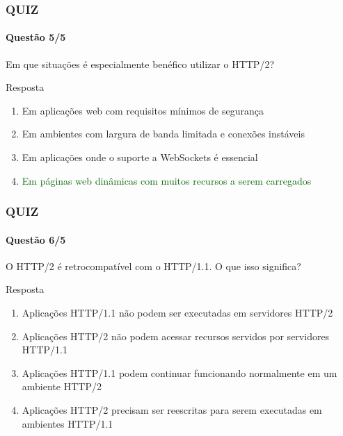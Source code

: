 \documentclass[
	9pt, %
	t, %
]{beamer}
\begin{document}
\begin{frame}
	\frametitle{QUIZ}
	\framesubtitle{Questão 5/5}

	{\Large Em que situações é especialmente benéfico utilizar o HTTP/2? }

	\begin{exampleblock}{Resposta}
		\begin{enumerate}[a]
			\item Em aplicações web com requisitos mínimos de segurança
			\item Em ambientes com largura de banda limitada e conexões instáveis
			\item Em aplicações onde o suporte a WebSockets é essencial
			\item \textcolor{darkgreen}{Em páginas web dinâmicas com muitos recursos a serem carregados}
		\end{enumerate}
	\end{exampleblock}

\end{frame}

\begin{frame}
	\frametitle{QUIZ}
	\framesubtitle{Questão 6/5}

	{\Large O HTTP/2 é retrocompatível com o HTTP/1.1. O que isso significa? }

	\begin{exampleblock}{Resposta}
		\begin{enumerate}[a]
			\item Aplicações HTTP/1.1 não podem ser executadas em servidores HTTP/2
			\item Aplicações HTTP/2 não podem acessar recursos servidos por servidores HTTP/1.1
			\item Aplicações HTTP/1.1 podem continuar funcionando normalmente em um ambiente HTTP/2
			\item Aplicações HTTP/2 precisam ser reescritas para serem executadas em ambientes HTTP/1.1
		\end{enumerate}
	\end{exampleblock}

\end{frame}
\end{document}
